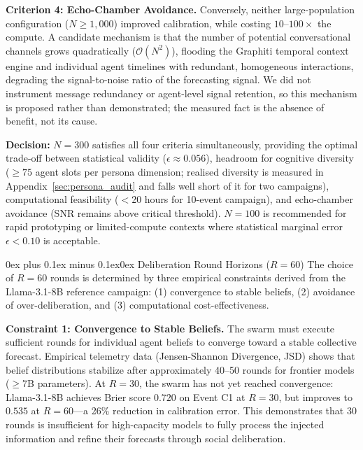 \documentclass[11pt,journal,onecolumn]{IEEEtran}
\makeatletter
\renewcommand\subsubsection{\@startsection{subsubsection}{3}{\parindent}%
  {0ex plus 0.1ex minus 0.1ex}{0ex}%
  {\normalfont\normalsize\bfseries\itshape}}
\makeatother
\begin{document}
\textbf{Criterion 4: Echo-Chamber Avoidance.}
Conversely, neither large-population configuration ($N \ge 1{,}000$) improved calibration, while costing $10$--$100\times$ the compute. A candidate mechanism is that the number of potential conversational channels grows quadratically ($\mathcal{O}(N^2)$), flooding the Graphiti temporal context engine and individual agent timelines with redundant, homogeneous interactions, degrading the signal-to-noise ratio of the forecasting signal. We did not instrument message redundancy or agent-level signal retention, so this mechanism is proposed rather than demonstrated; the measured fact is the absence of benefit, not its cause.

\textbf{Decision:} $N=300$ satisfies all four criteria simultaneously, providing the optimal trade-off between statistical validity ($\epsilon \approx 0.056$), headroom for cognitive diversity ($\geq 75$ agent slots per persona dimension; realised diversity is measured in Appendix~\ref{sec:persona_audit} and falls well short of it for two campaigns), computational feasibility ($<$20 hours for 10-event campaign), and echo-chamber avoidance (SNR remains above critical threshold). $N=100$ is recommended for rapid prototyping or limited-compute contexts where statistical marginal error $\epsilon < 0.10$ is acceptable.

\subsubsection{Deliberation Round Horizons ($R = 60$)}
The choice of $R=60$ rounds is determined by three empirical constraints derived from the Llama-3.1-8B reference campaign: (1) convergence to stable beliefs, (2) avoidance of over-deliberation, and (3) computational cost-effectiveness.

\textbf{Constraint 1: Convergence to Stable Beliefs.}
The swarm must execute sufficient rounds for individual agent beliefs to converge toward a stable collective forecast. Empirical telemetry data (Jensen-Shannon Divergence, JSD) shows that belief distributions stabilize after approximately 40--50 rounds for frontier models ($\geq$7B parameters). At $R=30$, the swarm has not yet reached convergence: Llama-3.1-8B achieves Brier score $0.720$ on Event C1 at $R=30$, but improves to $0.535$ at $R=60$---a 26\% reduction in calibration error. This demonstrates that 30 rounds is insufficient for high-capacity models to fully process the injected information and refine their forecasts through social deliberation.
\end{document}
